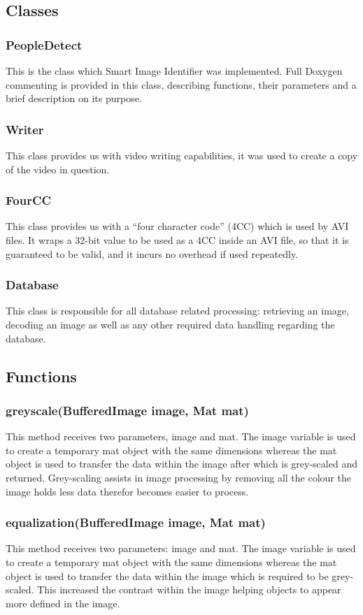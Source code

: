 \documentclass[a4paper,12pt]{report}
\begin{document}
	\subsection{Classes}
	\subsubsection{PeopleDetect}
	This is the class which Smart Image Identifier was implemented.
	Full Doxygen commenting is provided in this class, describing functions, their parameters
	and a brief description on its purpose.
	\subsubsection{Writer}
This class provides us with video writing capabilities, it was used to create a copy of the
video in question.
\subsubsection{FourCC}
This class provides us with a “four character code” (4CC) which is used by AVI files.
It wraps a 32-bit value to be used as a 4CC inside an AVI file, so that it is guaranteed to be
valid, and it incurs no overhead if used repeatedly.

\subsubsection{Database}
This class is responsible for all database related processing: retrieving an image, decoding an image as well as any other required data handling regarding the database.

\subsection{Functions}
\subsubsection{greyscale(BufferedImage image, Mat mat)}
This method receives two parameters, image and mat. The image variable is used to
create a temporary mat object with the same dimensions whereas the mat object is used
to transfer the data within the image after which is grey-scaled and returned.
Grey-scaling assists in image processing by removing all the colour the image holds less
data therefor becomes easier to process.
\subsubsection{equalization(BufferedImage image, Mat mat)}
This method receives two parameters: image and mat. The image variable is used to
create a temporary mat object with the same dimensions whereas the mat object is used
to transfer the data within the image which is required to be grey-scaled.
This increased the contrast within the image helping objects to appear more defined in
the image.
\end{document}
